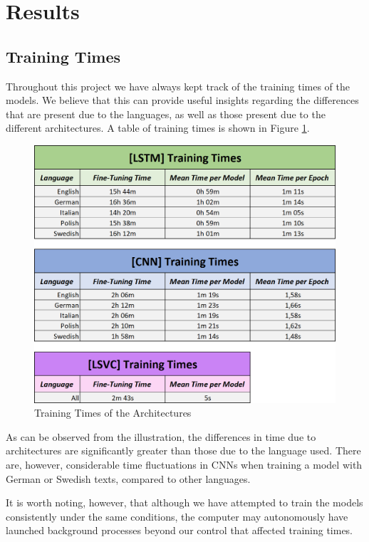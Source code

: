 \documentclass[letterpaper,11pt]{article}
\begin{document}
\section{Results}
\label{sec:results}

\subsection{Training Times}

Throughout this project we have always kept track of the training times of the models. We believe that this can provide useful insights regarding the differences that are present due to the languages, as well as those present due to the different architectures. A table of training times is shown in Figure \ref{fig:training_times}.

\begin{figure}[H]
  \centering
  \includegraphics[width=11.2cm]{fine_tuning_times.png}
  \caption{Training Times of the Architectures}
  \label{fig:training_times}
\end{figure}

As can be observed from the illustration, the differences in time due to architectures are significantly greater than those due to the language used. There are, however, considerable time fluctuations in CNNs when training a model with German or Swedish texts, compared to other languages. 

It is worth noting, however, that although we have attempted to train the models consistently under the same conditions, the computer may autonomously have launched background processes beyond our control that affected training times.
\end{document}
